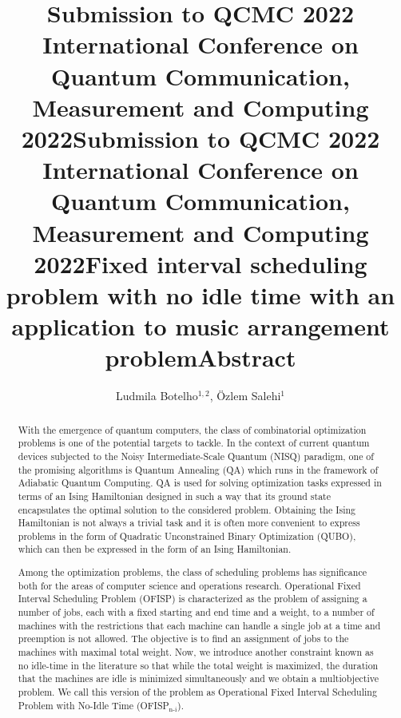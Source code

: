 \documentclass[aps,reprint]{revtex4-2}
\title@column %
\title{\normalsize Submission to QCMC 2022 \\ %
            International Conference on Quantum Communication,\\ 
            Measurement and Computing 2022}
\makeatletter
\newcommand{\printentry}{%
    \@author@finish%
    \title@column %
    \titleblock@produce %
    \suppressfloats[t] %
    \let\@AAC@list\@empty %
    \let\@AFF@list\@empty %
    \let\@AFG@list\@empty %
    \let\@address\@empty %
    \titlepage@sw %
    {\vfil\clearpage}%
}
\newcommand{\printheader}{%
    \title{\normalsize Submission to QCMC 2022 \\ %
            International Conference on Quantum Communication,\\ 
            Measurement and Computing 2022}
    \printentry
}
\makeatother
\begin{document}
\printheader



\title{Fixed interval scheduling problem with no idle time with an application to music arrangement problem} %
\author{Ludmila Botelho$^{1,2}$, \"Ozlem Salehi$^{1}$} %
{} %

\printentry
\title{\small Abstract}
\begin{abstract}
  

With the emergence of quantum computers, the class of combinatorial optimization problems is one of the potential targets to tackle. In the context of current quantum devices subjected to the Noisy Intermediate-Scale Quantum (NISQ) paradigm, one of the promising algorithms is Quantum Annealing (QA) which runs in the framework of Adiabatic Quantum Computing. QA is used for solving optimization tasks expressed in terms of an Ising Hamiltonian designed in such a way that its ground state encapsulates the optimal solution to the considered problem. Obtaining the Ising Hamiltonian is not always a trivial task and it is often more convenient to express problems in the form of  Quadratic Unconstrained Binary Optimization (QUBO), which can then be expressed in the form of an Ising Hamiltonian.

Among the optimization problems, the class of scheduling problems has significance both for the areas of computer science and operations research. Operational Fixed Interval Scheduling Problem (OFISP)  is characterized as the problem of assigning a number of jobs, each with a fixed starting and end time and a weight, to a number of machines with the restrictions that each machine can handle a single job at a time and preemption is not allowed. The objective is to find an assignment of jobs to the machines with maximal total weight. Now, we introduce another constraint known as no idle-time in the literature so that while the total weight is maximized, the duration that the machines are idle is minimized simultaneously and we obtain a multiobjective problem. We call this version of the problem as Operational Fixed Interval Scheduling Problem with No-Idle Time (OFISP$_\text{n-i}$).   


\end{abstract}
\end{document}

